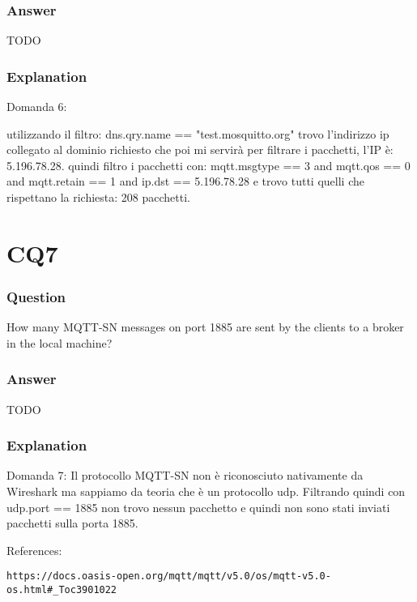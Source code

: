 \subsubsection{Answer}
TODO 

\subsubsection{Explanation}

Domanda 6:

utilizzando il filtro: dns.qry.name == "test.mosquitto.org" trovo l'indirizzo ip collegato al dominio richiesto che poi mi servirà per filtrare i pacchetti, l'IP è:  5.196.78.28.
quindi filtro i pacchetti con: mqtt.msgtype == 3 and mqtt.qos == 0 and mqtt.retain == 1 and ip.dst == 5.196.78.28 e trovo tutti quelli che rispettano la richiesta: 208 pacchetti.

\section{CQ7}
\subsubsection{Question}
How many MQTT-SN messages on port 1885 are sent by the clients to a broker in the local machine?

\subsubsection{Answer}
TODO 

\subsubsection{Explanation}

Domanda 7: 
Il protocollo MQTT-SN non è riconosciuto nativamente da Wireshark ma sappiamo da teoria che è un protocollo udp. Filtrando quindi con udp.port == 1885 non trovo nessun pacchetto e quindi non sono stati inviati pacchetti sulla porta 1885.


References:
\begin{verbatim}
https://docs.oasis-open.org/mqtt/mqtt/v5.0/os/mqtt-v5.0-os.html#_Toc3901022
\end{verbatim}






















